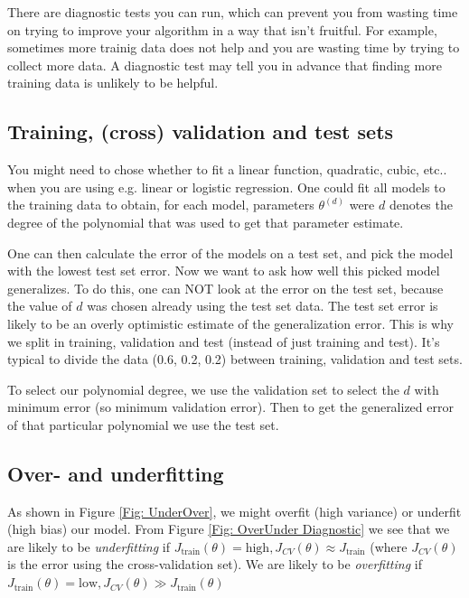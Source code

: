 \documentclass[a4paper, 10pt,hidelinks]{article}
\newcommand{\ind}[1]{^{(#1)}}
\begin{document}
There are diagnostic tests you can run, which can prevent you from wasting time on trying to improve your algorithm in a way that isn't fruitful. For example, sometimes more trainig data does not help and you are wasting time by trying to collect more data. A diagnostic test may tell you in advance that finding more training data is unlikely to be helpful.


\subsection{Training, (cross) validation and test sets}
You might need to chose whether to fit a linear function, quadratic, cubic, etc.. when you are using e.g. linear or logistic regression. One could fit all models to the training data to obtain, for each model, parameters $\theta\ind{d}$ were $d$ denotes the degree of the polynomial that was used to get that parameter estimate. 

One can then calculate the error of the models on a test set, and pick the model with the lowest test set error. Now we want to ask how well this picked model generalizes. To do this, one can NOT look at the error on the test set, because the value of $d$ was chosen already using the test set data. The test set error is likely to be an overly optimistic estimate of the generalization error. This is why we split in training, validation and test (instead of just training and test). It's typical to divide the data (0.6, 0.2, 0.2) between training, validation and test sets. 

To select our polynomial degree, we use the validation set to select the $d$ with minimum error (so minimum validation error). Then to get the generalized error of that particular polynomial we use the test set. 

\subsection{Over- and underfitting}
As shown in Figure \ref{Fig: UnderOver}, we might overfit (high variance) or underfit (high bias) our model. From Figure \ref{Fig: OverUnder Diagnostic} we see that we are likely to be \emph{underfitting} if $J_{\text{train}}(\theta) = \text{high}, J_{CV}(\theta) \approx J_{\text{train}}$ (where $J_{CV}(\theta)$ is the error using the cross-validation set). We are likely to be \emph{overfitting} if $J_{\text{train}}(\theta) = \text{low}, J_{CV}(\theta) \gg J_{\text{train}}(\theta)$
\end{document}
